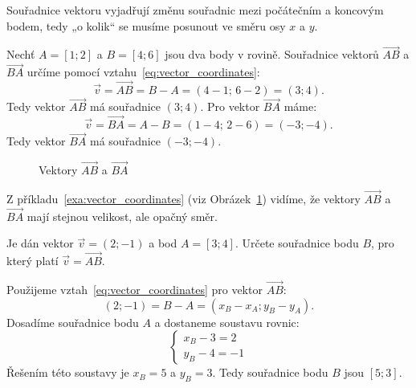 \begin{remark}
    Souřadnice vektoru vyjadřují změnu souřadnic mezi počátečním a koncovým bodem,
    tedy „o kolik“ se musíme posunout ve směru osy $x$ a $y$.
\end{remark}

\begin{example}\label{exa:vector_coordinates}
    Nechť $A = [1; 2]$ a $B = [4; 6]$ jsou dva body v rovině.
    Souřadnice vektorů $\overrightarrow{AB}$ a $\overrightarrow{BA}$ určíme pomocí vztahu~\eqref{eq:vector_coordinates}:
    \[
    \vec{v} = \overrightarrow{AB} = B - A = (4 - 1;\, 6 - 2) = (3; 4).
    \]
    Tedy vektor $\overrightarrow{AB}$ má souřadnice $(3; 4)$.
    Pro vektor $\overrightarrow{BA}$ máme:
    \[
    \vec{v} = \overrightarrow{BA} = A - B = (1 - 4;\, 2 - 6) = (-3; -4).
    \]
    Tedy vektor $\overrightarrow{BA}$ má souřadnice $(-3; -4)$.
    \begin{figure}[H]
        \centering
        \caption{Vektory $\overrightarrow{AB}$ a $\overrightarrow{BA}$}
        \label{fig:vector_coordinates_example}
    \end{figure}
\end{example}

Z příkladu~\ref{exa:vector_coordinates} (viz Obrázek~\ref{fig:vector_coordinates_example}) vidíme,
že vektory $\overrightarrow{AB}$ a $\overrightarrow{BA}$ mají stejnou velikost, ale opačný směr.

\begin{example}
    Je dán vektor $\vec{v} = (2; -1)$ a bod $A = [3; 4]$.
    Určete souřadnice bodu $B$, pro který platí $\vec{v} = \overrightarrow{AB}$.

    Použijeme vztah~\eqref{eq:vector_coordinates} pro vektor $\overrightarrow{AB}$:
    \[
    (2; -1) = B - A = (x_B - x_A; y_B - y_A).
    \]
    Dosadíme souřadnice bodu $A$ a dostaneme soustavu rovnic:
    \[
    \begin{cases}
        x_B - 3 = 2 \\
        y_B - 4 = -1
    \end{cases}
    \]
    Řešením této soustavy je $x_B = 5$ a $y_B = 3$.
    Tedy souřadnice bodu $B$ jsou $[5; 3]$.
\end{example}

